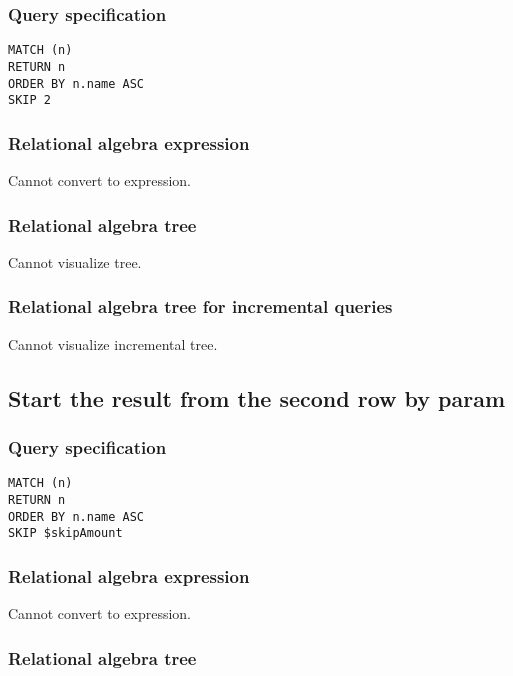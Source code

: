 \subsubsection*{Query specification}

\begin{lstlisting}
MATCH (n)
RETURN n
ORDER BY n.name ASC
SKIP 2
\end{lstlisting}

\subsubsection*{Relational algebra expression}

Cannot convert to expression.

\subsubsection*{Relational algebra tree}

Cannot visualize tree.

\subsubsection*{Relational algebra tree for incremental queries}

Cannot visualize incremental tree.

\subsection{Start the result from the second row by param}

\subsubsection*{Query specification}

\begin{lstlisting}
MATCH (n)
RETURN n
ORDER BY n.name ASC
SKIP $skipAmount
\end{lstlisting}

\subsubsection*{Relational algebra expression}

Cannot convert to expression.

\subsubsection*{Relational algebra tree}

